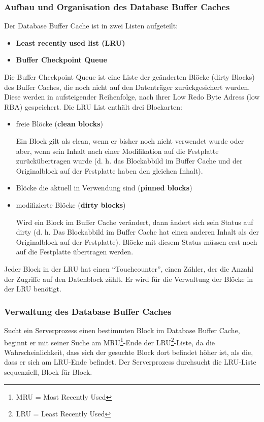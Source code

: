           \subsubsection{Aufbau und Organisation des Database Buffer Caches}
            Der Database Buffer Cache ist in zwei Listen aufgeteilt:
            \begin{itemize}
              \item \textbf{Least recently used list (LRU)}
              \item \textbf{Buffer Checkpoint Queue}
            \end{itemize}
						Die Buffer Checkpoint Queue ist eine Liste der geänderten Blöcke (dirty Blocks) des Buffer Caches, die noch nicht auf den Datenträger zurückgesichert wurden. Diese werden in aufsteigender Reihenfolge, nach ihrer Low Redo Byte Adress (low RBA) gespeichert.
\clearpage
            Die LRU List enthält drei Blockarten:
            \begin{itemize}
              \item freie Blöcke (\textbf{clean blocks})

              Ein Block gilt als clean, wenn er bisher noch nicht verwendet wurde oder aber, wenn sein Inhalt nach einer Modifikation auf die Festplatte zurückübertragen wurde (d. h. das Blockabbild im Buffer Cache und der Originalblock auf der Festplatte haben den gleichen Inhalt).
              \item Blöcke die aktuell in Verwendung sind (\textbf{pinned blocks})
              \item modifizierte Blöcke (\textbf{dirty blocks})

              Wird ein Block im Buffer Cache verändert, dann ändert sich sein Status auf dirty (d. h. Das Blockabbild im Buffer Cache hat einen anderen Inhalt als der Originalblock auf der Festplatte). Blöcke mit diesem Status müssen erst noch auf die Festplatte übertragen werden.
            \end{itemize}


            Jeder Block in der LRU hat einen \enquote{Touchcounter}, einen Zähler, der die Anzahl der Zugriffe auf den Datenblock zählt. Er wird für die Verwaltung der Blöcke in der LRU benötigt.
          \subsubsection{Verwaltung des Database Buffer Caches}
            Sucht ein Serverprozess einen bestimmten Block im Database Buffer Cache, beginnt er mit seiner Suche am MRU\footnote{MRU = Most Recently Used}-Ende der LRU\footnote{LRU = Least Recently Used}-Liste, da die Wahrscheinlichkeit, dass sich der gesuchte Block dort befindet höher ist, als die, dass er sich am LRU-Ende befindet. Der Serverprozess durchsucht die LRU-Liste sequenziell, Block für Block.

